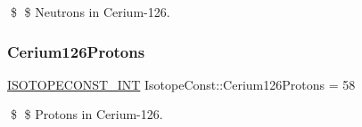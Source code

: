 \$ \$ Neutrons in Cerium-\/126. \mbox{\label{group___isotope_const-_cerium-_ce126_ga101c638b298f0f6443d8eeda1ccfd9a2}} 
\subsubsection{\texorpdfstring{Cerium126\+Protons}{Cerium126Protons}}
{\footnotesize\ttfamily \mbox{\hyperlink{group___isotope_const-_macros_ga5f18360b3e99483a35c32d789e62621c}{I\+S\+O\+T\+O\+P\+E\+C\+O\+N\+S\+T\+\_\+\+I\+NT}} Isotope\+Const\+::\+Cerium126\+Protons = 58}

\$ \$ Protons in Cerium-\/126. 